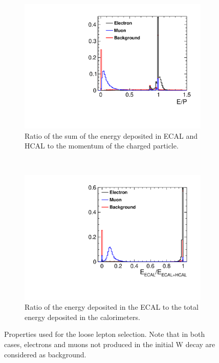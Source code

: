 \begin{figure}
  \centering
  \begin{subfigure}[t]{.48\textwidth}
    \centering
    \includegraphics[width=1.0\linewidth,keepaspectratio]{HiggsAnalysis/figures/EByP}
    \caption{Ratio of the sum of the energy deposited in ECAL and HCAL to the momentum of the charged particle.}
  \end{subfigure}~
    \vspace{4ex}
  \begin{subfigure}[t]{.48\textwidth}
    \centering
    \includegraphics[width=1.0\linewidth,keepaspectratio]{HiggsAnalysis/figures/ECALByE}
    \caption{Ratio of the energy deposited in the ECAL to the total energy deposited in the calorimeters. }
  \end{subfigure}
  \caption[Parameters used for loose lepton selection]{Properties used for the loose lepton selection.  Note that in both cases, electrons and muons not produced in the initial W decay are considered as background.}
  \label{fig:lepfinding}
\end{figure}


